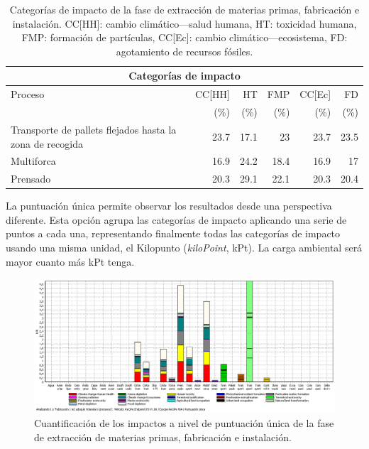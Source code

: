 \begin{table}[!htb]
\centering
\begin{tabular}{p{4cm}rrrrr}
\toprule
\multicolumn{6}{c}{Categorías de impacto}\\
\midrule
Proceso & CC[HH] & HT & FMP & CC[Ec] & FD\\
 &  (\%) & (\%) & (\%) & (\%) & (\%)\\
\midrule
Transporte de pallets flejados hasta la zona de recogida & 23.7 & 17.1 & 23 & 23.7 & 23.5\\
Multiforca & 16.9 & 24.2 & 18.4 & 16.9 & 17\\
Prensado & 20.3 & 29.1 & 22.1 & 20.3 & 20.4\\
\bottomrule
\end{tabular}
\caption[Categorías de impacto de la fase de extracción de materias primas, fabricación e instalación.]{Categorías de impacto de la fase de extracción de materias primas, fabricación e instalación. CC[HH]: cambio climático—salud humana, HT: toxicidad humana, FMP: formación de partículas, CC[Ec]: cambio climático—ecosistema, FD: agotamiento de recursos fósiles.}
\label{categoriasimpactofabricacion}
\end{table}

La puntuación única permite observar los resultados desde una perspectiva diferente. Esta opción agrupa las categorías de impacto aplicando una serie de puntos a cada una, representando finalmente todas las categorías de impacto usando una misma unidad, el Kilopunto (\textit{kiloPoint}, kPt). La carga ambiental será mayor cuanto más kPt tenga.

\begin{figure}[!htb]
\centering
\includegraphics[width=15cm]{img/fabric_puntuacionunica.png}
\caption{Cuantificación de los impactos a nivel de puntuación única de la fase de extracción de materias primas, fabricación e instalación.}
\label{fig:fabric_puntuacionunica}
\end{figure}

